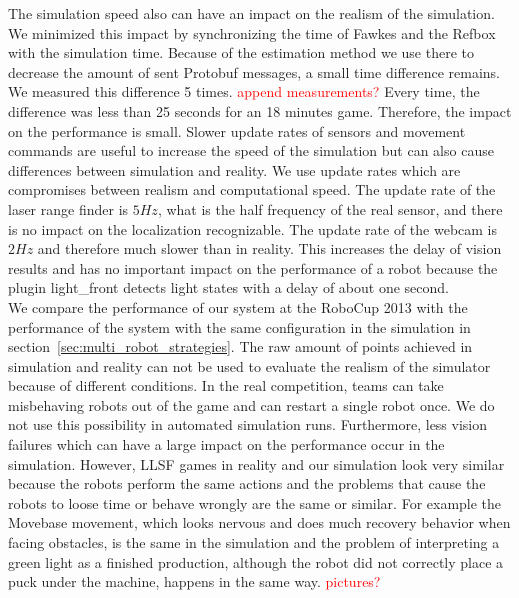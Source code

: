 The simulation speed also can have an impact on the realism of the simulation. We minimized this impact by synchronizing the time of Fawkes and the Refbox with the simulation time. Because of the estimation method we use there to decrease the amount of sent Protobuf messages, a small time difference remains. We measured this difference 5 times. \textcolor{red}{append measurements?} Every time, the difference was less than 25 seconds for an 18 minutes game. Therefore, the impact on the performance is small.
Slower update rates of sensors and movement commands are useful to increase the speed of the simulation but can also cause differences between simulation and reality. We use update rates which are compromises between realism and computational speed. The update rate of the laser range finder is $5 Hz$, what is the half frequency of the real sensor, and there is no impact on the localization recognizable. The update rate of the webcam is $2 Hz$ and therefore much slower than in reality. This increases the delay of vision results and has no important impact on the performance of a robot because the plugin light\_front detects light states with a delay of about one second.\\
We compare the performance of our system at the RoboCup 2013 with the performance of the system with the same configuration in the simulation in section~\ref{sec:multi_robot_strategies}. The raw amount of points achieved in simulation and reality can not be used to evaluate the realism of the simulator because of different conditions. In the real competition, teams can take misbehaving robots out of the game and can restart a single robot once. We do not use this possibility in automated simulation runs. Furthermore, less vision failures which can have a large impact on the performance occur in the simulation. However, LLSF games in reality and our simulation look very similar because the robots perform the same actions and the problems that cause the robots to loose time or behave wrongly are the same or similar. For example the Movebase movement, which looks nervous and does much recovery behavior when facing obstacles, is the same in the simulation and the problem of interpreting a green light as a finished production, although the robot did not correctly place a puck under the machine, happens in the same way.
\textcolor{red}{pictures?}

